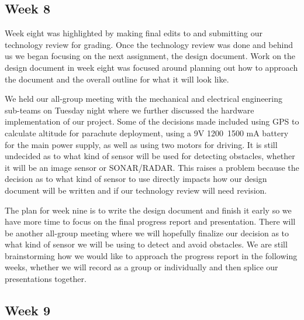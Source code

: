 \documentclass[10pt,letterpaper,onecolumn,draftclsnofoot,journal]{IEEEtran}
\begin{document}
\subsection{Week 8}
\par
Week eight was highlighted by making final edits to and submitting our technology review for grading. Once the technology review was done and behind us we began focusing on the next assignment, the design document. Work on the design document in week eight was focused around planning out how to approach the document and the overall outline for what it will look like.\vspace{.3cm}
\par
We held our all-group meeting with the mechanical and electrical engineering sub-teams on Tuesday night where we further discussed the hardware implementation of our project. Some of the decisions made included using GPS to calculate altitude for parachute deployment, using a 9V 1200~1500 mA battery for the main power supply, as well as using two motors for driving. It is still undecided as to what kind of sensor will be used for detecting obstacles, whether it will be an image sensor or SONAR/RADAR. This raises a problem because the decision as to what kind of sensor to use directly impacts how our design document will be written and if our technology review will need revision.\vspace{.3cm}
\par
The plan for week nine is to write the design document and finish it early so we have more time to focus on the final progress report and presentation. There will be another all-group meeting where we will hopefully finalize our decision as to what kind of sensor we will be using to detect and avoid obstacles. We are still brainstorming how we would like to approach the progress report in the following weeks, whether we will record as a group or individually and then splice our presentations together.\vspace{.3cm}
\par

\subsection{Week 9}
\end{document}

